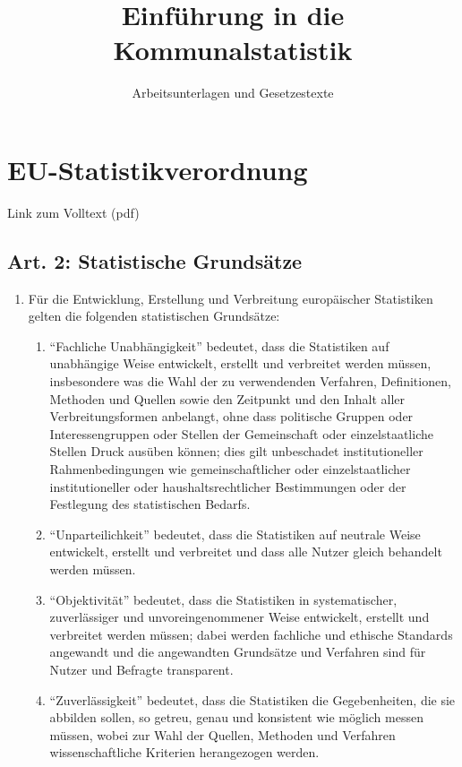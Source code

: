 \documentclass[12pt]{scrbook}
\title{Einführung in die Kommunalstatistik}
\subtitle{Arbeitsunterlagen und Gesetzestexte}
\begin{document}
\maketitle
\tableofcontents

\chapter[EU-StatV]{EU-Statistikverordnung}
Link zum Volltext (pdf)
    \section{Art. 2: Statistische Grundsätze}
        \begin{enumerate}[label=(\arabic*)]
            \item Für die Entwicklung, Erstellung und Verbreitung europäischer Statistiken gelten die folgenden statistischen Grundsätze:
            \begin{enumerate}
                \item ``Fachliche Unabhängigkeit'' bedeutet, dass die Statistiken auf unabhängige Weise entwickelt, erstellt und verbreitet werden müssen, insbesondere was die Wahl der zu verwendenden Verfahren, Definitionen, Methoden und Quellen sowie den Zeitpunkt und den Inhalt aller Verbreitungsformen anbelangt, ohne dass politische Gruppen oder Interessengruppen oder Stellen der Gemeinschaft oder einzelstaatliche Stellen Druck ausüben können; dies gilt unbeschadet institutioneller Rahmenbedingungen wie gemeinschaftlicher oder einzelstaatlicher institutioneller oder haushaltsrechtlicher Bestimmungen oder der Festlegung des statistischen Bedarfs.
                \item ``Unparteilichkeit'' bedeutet, dass die Statistiken auf neutrale Weise entwickelt, erstellt und verbreitet und dass alle Nutzer gleich behandelt werden müssen.
                \item ``Objektivität'' bedeutet, dass die Statistiken in systematischer, zuverlässiger und unvoreingenommener Weise entwickelt, erstellt und verbreitet werden müssen; dabei werden fachliche und ethische Standards angewandt und die angewandten Grundsätze und Verfahren sind für Nutzer und Befragte transparent.
                \item ``Zuverlässigkeit'' bedeutet, dass die Statistiken die Gegebenheiten, die sie abbilden sollen, so getreu, genau und konsistent wie möglich messen müssen, wobei zur Wahl der Quellen, Methoden und Verfahren wissenschaftliche Kriterien herangezogen werden.

\end{enumerate}
\end{enumerate}
\end{document}
